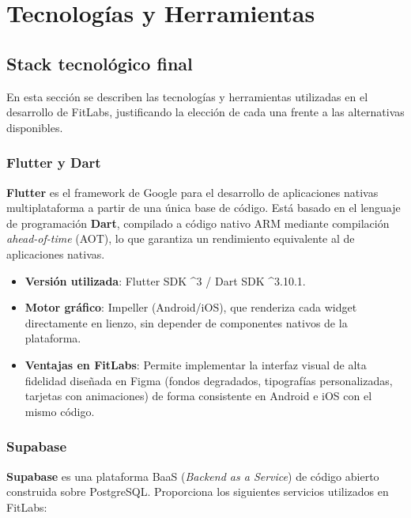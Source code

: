 \chapter{Tecnologías y Herramientas}

\section{Stack tecnológico final}

En esta sección se describen las tecnologías y herramientas utilizadas en el desarrollo de FitLabs, justificando la elección de cada una frente a las alternativas disponibles.

\subsection{Flutter y Dart}

\textbf{Flutter} es el framework de Google para el desarrollo de aplicaciones nativas multiplataforma a partir de una única base de código. Está basado en el lenguaje de programación \textbf{Dart}, compilado a código nativo ARM mediante compilación \textit{ahead-of-time} (AOT), lo que garantiza un rendimiento equivalente al de aplicaciones nativas.

\begin{itemize}
  \item \textbf{Versión utilizada}: Flutter SDK \^{}3 / Dart SDK \^{}3.10.1.
  \item \textbf{Motor gráfico}: Impeller (Android/iOS), que renderiza cada widget directamente en lienzo, sin depender de componentes nativos de la plataforma.
  \item \textbf{Ventajas en FitLabs}: Permite implementar la interfaz visual de alta fidelidad diseñada en Figma (fondos degradados, tipografías personalizadas, tarjetas con animaciones) de forma consistente en Android e iOS con el mismo código.
\end{itemize}

\subsection{Supabase}

\textbf{Supabase} es una plataforma BaaS (\textit{Backend as a Service}) de código abierto construida sobre PostgreSQL. Proporciona los siguientes servicios utilizados en FitLabs:

